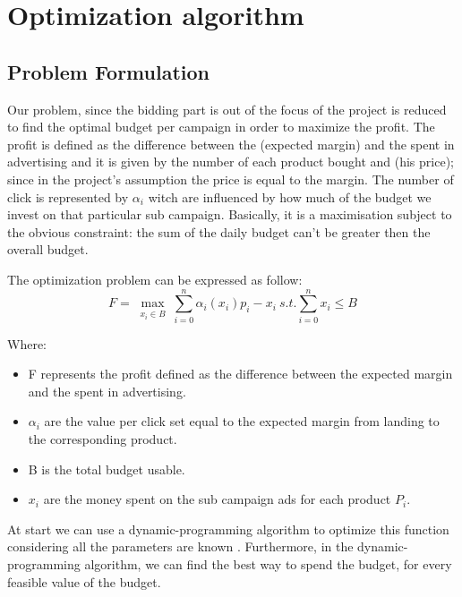 \chapter{Optimization algorithm}
\label{chap:opt_alg}

\section{Problem Formulation}
\label{sec:Opt_Problem Formulation}
Our problem, since the bidding part is out of the focus of the project is reduced to find the optimal budget per campaign in order to maximize the profit.
The profit is defined as the difference between the (expected margin) and the spent in advertising and it is given by the number of each product bought and (his price); since in the project's assumption the price is equal to the margin.
The number of click is represented by $\alpha_i$ witch are influenced by how much of the budget we invest on that particular sub campaign.
Basically, it is a maximisation subject to the obvious constraint: the sum of the daily budget can't be greater then the overall budget.


The optimization problem can be expressed as follow:
\begin{displaymath}
F=\max_\substack{x_i\in B} \sum_{i=0}^n \alpha_i(x_i)p_i-x_i \ s.t. \sum_{i=0}^n x_i\leq B  
\end{displaymath}

Where: \begin{itemize}
    \item F represents the profit defined as the difference between the expected margin and the spent in advertising.
    \item $\alpha_i$ are the value per click set equal to the expected margin from landing to the corresponding product.
    \item B is the total budget usable.
    \item $x_i$ are the money spent on the sub campaign ads for each product $P_i$.
        \end{itemize}

At start we can use a dynamic-programming algorithm to optimize this function considering all the parameters are known
. Furthermore, in the dynamic-programming algorithm, we can find the best way to spend the budget, for every feasible value of the budget. 

